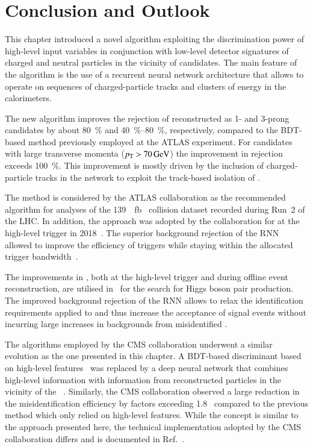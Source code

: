 \section{Conclusion and Outlook}%
\label{sec:tauid_conclusion}

This chapter introduced a novel \tauid algorithm exploiting the
discrimination power of high-level input variables in conjunction with
low-level detector signatures of charged and neutral particles in the
vicinity of \tauhadvis candidates. The main feature of the algorithm
is the use of a recurrent neural network architecture that allows to
operate on sequences of charged-particle tracks and clusters of energy
in the calorimeters.

The new algorithm improves the rejection of \faketauhadvis
reconstructed as 1- and 3-prong \tauhadvis candidates by about
\SI{80}{\percent} and \SIrange{40}{80}{\percent}, respectively,
compared to the BDT-based method previously employed at the ATLAS
experiment. For \tauhadvis candidates with large transverse momenta
($\pT > \SI{70}{\GeV}$) the improvement in \faketauhadvis rejection
exceeds \SI{100}{\percent}. This improvement is mostly driven by the
inclusion of charged-particle tracks in the network to exploit the
track-based isolation of \tauhadvis.

The method is considered by the ATLAS collaboration as the recommended
\tauid algorithm for analyses of the \SI{139}{\per\femto\barn}
\pp~collision dataset recorded during Run~2 of the LHC. In addition,
the approach was adopted by the collaboration for \tauid at the
high-level trigger in 2018~\cite{ATL-DAQ-PUB-2019-001}. The superior
background rejection of the RNN \tauid allowed to improve the
efficiency of \tauhadvis triggers while staying within the allocated
trigger bandwidth~\cite{ATL-DAQ-PUB-2019-001}.

The improvements in \tauid, both at the high-level trigger and during
offline event reconstruction, are utilised in~ for
the search for Higgs boson pair production. The improved background
rejection of the RNN allows to relax the identification requirements
applied to \tauhadvis and thus increase the acceptance of signal
events without incurring large increases in backgrounds from
misidentified \tauhadvis.

The \tauid algorithms employed by the CMS collaboration underwent a
similar evolution as the one presented in this chapter. A BDT-based
discriminant based on high-level features~\cite{CMS-TAU-16-003} was
replaced by a deep neural network that combines high-level information
with information from reconstructed particles in the vicinity of the
\tauhadvis~\cite{CMS-TAU-20-001}. Similarly, the CMS collaboration
observed a large reduction in the \faketauhadvis misidentification
efficiency by factors exceeding 1.8~\cite{CMS-TAU-20-001} compared to
the previous method which only relied on high-level features. While
the concept is similar to the approach presented here, the technical
implementation adopted by the CMS collaboration differs and is
documented in Ref.~\cite{CMS-TAU-20-001}.

